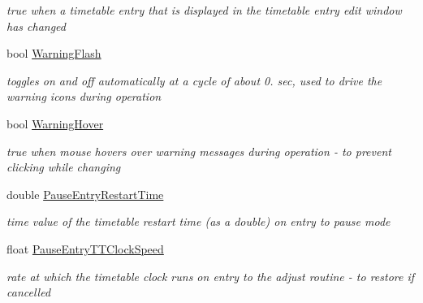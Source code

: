 \begin{DoxyCompactItemize}
\begin{DoxyCompactList}\small\item\em true when a timetable entry that is displayed in the timetable entry edit window has changed \end{DoxyCompactList}\item 
\mbox{\label{class_t_interface_a62422649dfbc50527056fc4c2979f270}} 
bool \mbox{\hyperlink{class_t_interface_a62422649dfbc50527056fc4c2979f270}{Warning\+Flash}}
\begin{DoxyCompactList}\small\item\em toggles on and off automatically at a cycle of about 0. sec, used to drive the warning icons during operation \end{DoxyCompactList}\item 
\mbox{\label{class_t_interface_a928b389995d7601e79e0114f400e21f6}} 
bool \mbox{\hyperlink{class_t_interface_a928b389995d7601e79e0114f400e21f6}{Warning\+Hover}}
\begin{DoxyCompactList}\small\item\em true when mouse hovers over warning messages during operation -\/ to prevent clicking while changing \end{DoxyCompactList}\item 
\mbox{\label{class_t_interface_a32337255881759fc912873adc8f203fc}} 
double \mbox{\hyperlink{class_t_interface_a32337255881759fc912873adc8f203fc}{Pause\+Entry\+Restart\+Time}}
\begin{DoxyCompactList}\small\item\em time value of the timetable restart time (as a double) on entry to pause mode \end{DoxyCompactList}\item 
\mbox{\label{class_t_interface_ac5ac42893d5e251c3f2be594981e1155}} 
float \mbox{\hyperlink{class_t_interface_ac5ac42893d5e251c3f2be594981e1155}{Pause\+Entry\+T\+T\+Clock\+Speed}}
\begin{DoxyCompactList}\small\item\em rate at which the timetable clock runs on entry to the adjust routine -\/ to restore if cancelled \end{DoxyCompactList}\item 
\mbox{\label{class_t_interface_a19373a8d9b089feaf0c68f3f2e21864b}} 

\end{DoxyCompactItemize}
